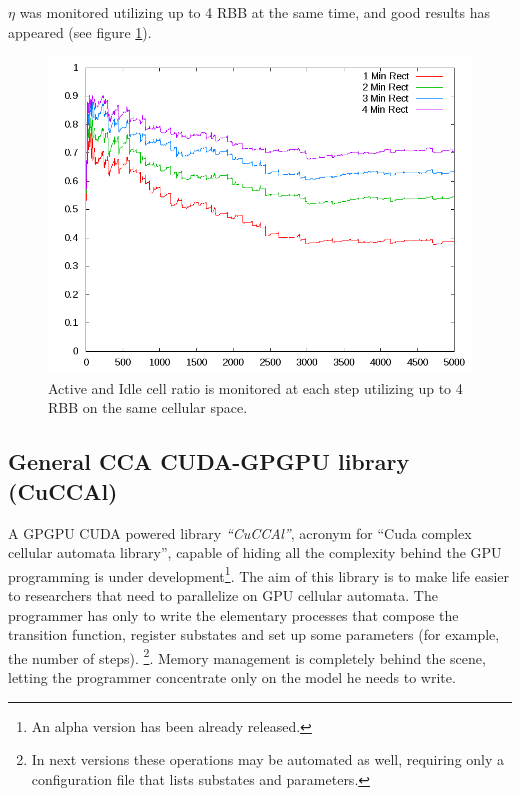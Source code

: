 \(\eta\) was monitored utilizing up to 4 RBB at the same time, and good results
has appeared (see figure \ref{fig:RBBcomparision}).  



\begin{figure}
\begin{center}
  \includegraphics[scale=0.42]{./images/RBBcomparision}
  \caption{Active and Idle cell ratio is
  monitored at each step utilizing up to 4 RBB on the same cellular space.}
  \label{fig:RBBcomparision}
\end{center}
\end{figure}


\subsection{General CCA CUDA-GPGPU library (CuCCAl)}
A GPGPU CUDA powered library \textit{``CuCCAl''}, acronym for ``Cuda
complex cellular automata library'', capable of hiding all the complexity behind
the GPU programming is under development\footnote{An alpha version has been already
released.}. The aim of this library is to make life easier to researchers that need
to parallelize on GPU cellular automata. 
The programmer has only to write the elementary processes that compose the
transition function, register substates and set up some parameters (for
example, the number of steps). \footnote{In next versions these operations may be
automated as well, requiring only a configuration file that lists substates and
parameters.}. Memory management is completely behind the scene, letting the
programmer concentrate only on the model he needs to write.


